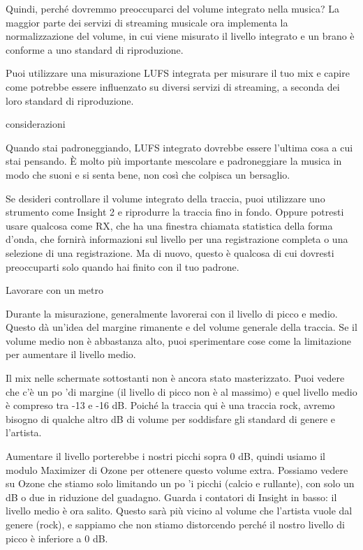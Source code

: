 Quindi, perché dovremmo preoccuparci del volume integrato nella musica?
La maggior parte dei servizi di streaming musicale ora implementa la
normalizzazione del volume, in cui viene misurato il livello integrato e un brano
è conforme a uno standard di riproduzione.

Puoi utilizzare una misurazione LUFS integrata per misurare il tuo mix e capire
come potrebbe essere influenzato su diversi servizi di streaming, a seconda dei
loro standard di riproduzione.

considerazioni

Quando stai padroneggiando, LUFS integrato dovrebbe essere l'ultima cosa a cui
stai pensando. È molto più importante mescolare e padroneggiare la musica in modo
che suoni e si senta bene, non così che colpisca un bersaglio.

Se desideri controllare il volume integrato della traccia, puoi utilizzare uno
strumento come Insight 2 e riprodurre la traccia fino in fondo. Oppure potresti
usare qualcosa come RX, che ha una finestra chiamata statistica della forma d'onda,
che fornirà informazioni sul livello per una registrazione completa o una selezione
di una registrazione. Ma di nuovo, questo è qualcosa di cui dovresti preoccuparti
solo quando hai finito con il tuo padrone.

Lavorare con un metro

Durante la misurazione, generalmente lavorerai con il livello di picco e medio.
Questo dà un'idea del margine rimanente e del volume generale della traccia. Se
il volume medio non è abbastanza alto, puoi sperimentare cose come la limitazione
per aumentare il livello medio.

Il mix nelle schermate sottostanti non è ancora stato masterizzato. Puoi vedere
che c'è un po 'di margine (il livello di picco non è al massimo) e quel livello
medio è compreso tra -13 e -16 dB. Poiché la traccia qui è una traccia rock,
avremo bisogno di qualche altro dB di volume per soddisfare gli standard di genere
e l'artista.

Aumentare il livello porterebbe i nostri picchi sopra 0 dB, quindi usiamo il
modulo Maximizer di Ozone per ottenere questo volume extra. Possiamo vedere su
Ozone che stiamo solo limitando un po 'i picchi (calcio e rullante), con solo
un dB o due in riduzione del guadagno.
Guarda i contatori di Insight in basso: il livello medio è ora salito. Questo
sarà più vicino al volume che l'artista vuole dal genere (rock), e sappiamo che
non stiamo distorcendo perché il nostro livello di picco è inferiore a 0 dB.

